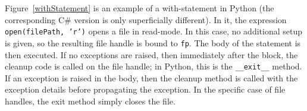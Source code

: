 \documentclass[11pt]{article}
\begin{document}

%
%
%    
%





Figure~\ref{withStatement} is an example of a with-statement in Python (the corresponding C\# version is only superficially different).
In it, the expression \texttt{open(filePath, 'r')} opens a file in read-mode.
In this case, no additional setup is given, so the resulting file handle is bound to \texttt{fp}.
The body of the statement is then executed.
If no exceptions are raised, then immediately after the block, the cleanup code is called on the file handle; in Python, this is the \texttt{\_\_exit\_\_} method.
If an exception is raised in the body, then the cleanup method is called with the exception details before propagating the exception.
In the specific case of file handles, the exit method simply closes the file.
\end{document}

